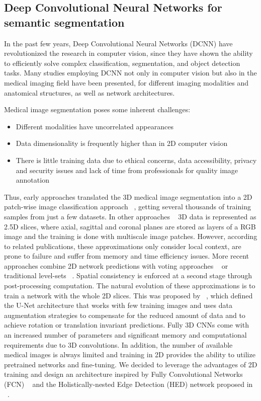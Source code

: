 \documentclass[preprint,authoryear,12pt]{elsarticle}
\begin{document}
\subsection{Deep Convolutional Neural Networks for semantic segmentation }
In the past few years, Deep Convolutional Neural Networks (DCNN) have revolutionized the research in computer vision, since they have shown the ability to efficiently solve complex classification, segmentation, and object detection tasks. Many studies employing DCNN not only in computer vision but also in the medical imaging field have been presented, for different imaging modalities and anatomical structures, as well as network architectures.  \par
Medical image segmentation poses some inherent challenges:
\begin{itemize}
\item Different modalities have uncorrelated appearances
\item Data dimensionality is frequently higher than in 2D computer vision
\item There is little training data due to ethical concerns, data accessibility, privacy and security issues and lack of time from professionals for quality image annotation
\end{itemize}
Thus, early approaches translated the 3D medical image segmentation into a 2D patch-wise image classification approach ~\citep{Cir12,Pra13},  getting several thousands of training samples from just a few datasets. In other approaches ~\citep{Rot14} 3D data is represented as 2.5D slices, where axial, sagittal and coronal planes are stored as layers of a RGB image and the training is done with multiscale image patches.  However, according to related publications, these approximations only consider local context, are prone to failure and suffer from memory and time efficiency issues. More recent approaches combine 2D network predictions with voting approaches ~\citep{Mil16a} or traditional level-sets ~\citep{Cha16}. Spatial consistency is enforced at a second stage through post-processing computation. The natural evolution of these approximations is to train a network with the whole 2D slices. This was proposed by ~\citep{Ron15}, which defined the U-Net architecture that works with few training images and uses data augmentation strategies to compensate for the reduced amount of data and to achieve rotation or translation invariant predictions.  Fully 3D CNNs come with an increased number of parameters and significant memory and computational requirements due to 3D convolutions. In addition, the number of available medical images is always limited and training in 2D provides the ability to utilize pretrained networks and fine-tuning. We decided to leverage the advantages of 2D training and design an architecture inspired by Fully Convolutional Networks (FCN) ~\citep{Lon15} and the Holistically-nested Edge Detection (HED) network proposed in ~\citep{Xie15}. 
\end{document}
